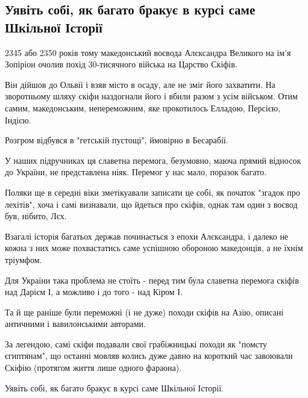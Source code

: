  
 
 
 
 
\subsection{Уявіть собі, як багато бракує в курсі саме Шкільної Історії}
\label{sec:17_05_2021.fb.promovugroup.1.skify}

2345 або 2350 років тому македонський воєвода Алєксандра Великого на ім'я
Зопіріон очолив похід 30-тисячного війська на Царство Скіфів. 

Він дійшов до Ольвії і взяв місто в осаду, але не зміг його захватити. На
зворотньому шляху скіфи наздогнали його і вбили разом з усім військом. Отим
самим, македонським, непереможним, яке прокотилось Елладою, Персією, Індією. 

Розгром відбувся в "гетській пустощі", ймовірно в Бесарабії. 

У наших підручниках ця славетна перемога, безумовно, маюча прямий відносок до
України, не представлена ніяк. Перемог у нас мало, поразок багато. 

Поляки ще в середні віки зметікуавали записати це собі, як початок "згадок про
лехітів", хоча і самі визнавали, що йдеться про скіфів, однак там один з воєвод
був, нібито, Лєх.

Взагалі історія багатьох держав починається з епохи Алєксандра, і далеко не
кожна з них може похвастатись саме успішною обороною македонців, а не їхнім
тріумфом. 

Для України така проблема не стоїть - перед тим була славетна перемога скіфів над Дарієм І, а можливо і до того - над Кіром І. 

Та й ще раніше були переможні (і не дуже) походи скіфів на Азію, описані
античними і вавилонськими авторами. 

За легендою, самі скіфи подавали свої грабіжницькі походи як "помсту
єгиптянам", що останні мовляв колись дуже давно на короткий час завоювали
Скіфію (протягом життя лише одного фараона). 

Уявіть собі, як багато бракує в курсі саме Шкільної Історії. 

